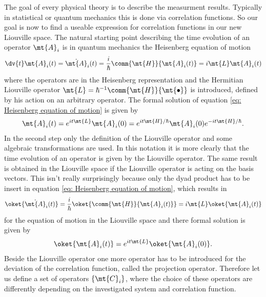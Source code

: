 The goal of every physical theory is to describe the measurment results.
Typically in statistical or quantum mechanics this is done via correlation functions.
So our goal is now to find a useable expression for correlation functions in our new Liouville space.
The natural starting point describing the time evolution of an operator $\mt{A}_{i}$ is in quantum mechanics the Heisenberg equation of motion
%
\begin{align}
	\dv{t} \mt{A}_{i}(t) = \dot{\mt{A}}_{i}(t) = \frac{i}{\hbar} \comm{\mt{H}}{\mt{A}_{i}(t)} = i \mt{L} \mt{A}_{i}(t)
	\label{eq: Heisenberg equation of motion}
\end{align}
%
where the operators are in the Heisenberg representation and the Hermitian Liouville operator ${\mt{L} = \hbar^{-1} \comm{\mt{H}}{\mt{\bullet}}}$ is introduced, defined by his action on an arbitrary operator.
The formal solution of equation \eqref{eq: Heisenberg equation of motion} is given by
%
\begin{align}
	\mt{A}_{i}(t) = e^{it\mt{L}} \mt{A}_{i}(0) = e^{it\mt{H}/\hbar} \mt{A}_{i}(0) e^{-it\mt{H}/\hbar}.
\end{align}
%
In the second step only the definition of the Liouville operator and some algebraic transformations are used. 
In this notation it is more clearly that the time evolution of an operator is given by the Liouville operator.
The same result is obtained in the Liouville space if the Liouville operator is acting on the basis vectors.
This isn't really surprisingly because only the dyad product has to be insert in equation \eqref{eq: Heisenberg equation of motion}, which results in
%
\begin{align}
	\oket{\dot{\mt{A}}_{i}(t)} = \frac{i}{\hbar} \oket{\comm{\mt{H}}{\mt{A}_{i}(t)}} = i \mt{L} \oket{\mt{A}_{i}(t)}
	\label{eq: Heisenberg equation of motion in Liouville space}
\end{align}
%
for the equation of motion in the Liouville space and there formal solution is given by
%
\begin{align}
	\oket{\mt{A}_{i}(t)} = e^{it\mt{L}} \oket{\mt{A}_{i}(0)}.
	\label{eq: formal solution of EM in L}
\end{align}
%
Beside the Liouville operator one more operator has to be introduced for the deviation of the correlation function, called the projection operator.
Therefore let us define a set of operators $\{\mt{C}_{i}\}$, where the choice of these operators are differently depending on the investigated system and correlation function.

